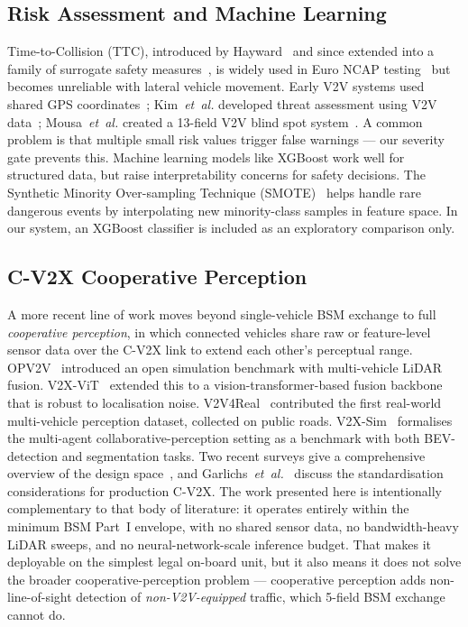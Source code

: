 \documentclass[sn-mathphys-num,Numbered,iicol]{sn-jnl}
\begin{document}
\subsection{Risk Assessment and Machine Learning}
Time-to-Collision (TTC), introduced by Hayward~\cite{hayward1972} and since extended into a family of surrogate safety measures~\cite{minderhoud2001}, is widely used in Euro NCAP testing~\cite{euroncap2019} but becomes unreliable with lateral vehicle movement. Early V2V systems used shared GPS coordinates~\cite{rawashdeh2008}; Kim~\textit{et~al.} developed threat assessment using V2V data~\cite{kim2015}; Mousa~\textit{et~al.} created a 13-field V2V blind spot system~\cite{mousa2021}. A common problem is that multiple small risk values trigger false warnings --- our severity gate prevents this. Machine learning models like XGBoost work well for structured data, but raise interpretability concerns for safety decisions. The Synthetic Minority Over-sampling Technique (SMOTE)~\cite{smote2002} helps handle rare dangerous events by interpolating new minority-class samples in feature space. In our system, an XGBoost classifier is included as an exploratory comparison only.

\subsection{C-V2X Cooperative Perception}
A more recent line of work moves beyond single-vehicle BSM exchange to full \emph{cooperative perception}, in which connected vehicles share raw or feature-level sensor data over the C-V2X link to extend each other's perceptual range. OPV2V~\cite{xu2022opv2v} introduced an open simulation benchmark with multi-vehicle LiDAR fusion. V2X-ViT~\cite{xu2022v2xvit} extended this to a vision-transformer-based fusion backbone that is robust to localisation noise. V2V4Real~\cite{xu2023v2v4real} contributed the first real-world multi-vehicle perception dataset, collected on public roads. V2X-Sim~\cite{li2023v2xsim} formalises the multi-agent collaborative-perception setting as a benchmark with both BEV-detection and segmentation tasks. Two recent surveys give a comprehensive overview of the design space~\cite{caillot2022survey,liu2023cooper}, and Garlichs~\textit{et~al.}~\cite{garlichs2023cv2x} discuss the standardisation considerations for production C-V2X. The work presented here is intentionally complementary to that body of literature: it operates entirely within the minimum BSM Part~I envelope, with no shared sensor data, no bandwidth-heavy LiDAR sweeps, and no neural-network-scale inference budget. That makes it deployable on the simplest legal on-board unit, but it also means it does not solve the broader cooperative-perception problem --- cooperative perception adds non-line-of-sight detection of \emph{non-V2V-equipped} traffic, which 5-field BSM exchange cannot do.
\end{document}
